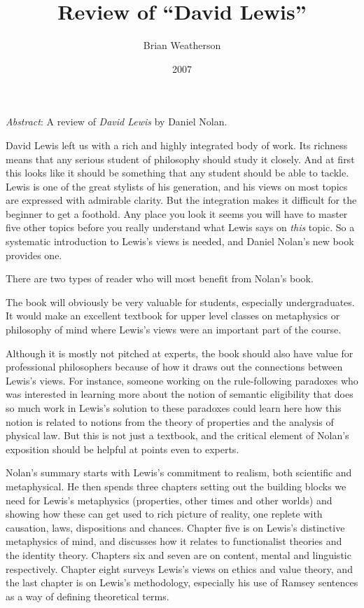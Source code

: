 \documentclass[
  11pt,
  letterpaper,
  DIV=11,
  numbers=noendperiod,
  twoside]{scrartcl}
\title{Review of ``David Lewis''}
\author{Brian Weatherson}
\date{2007}
\renewenvironment{abstract}
 {\vspace{-1.25cm}
 \quotation\small\noindent\emph{Abstract}:}
 {\endquotation}
\begin{document}
\maketitle
\begin{abstract}
A review of \emph{David Lewis} by Daniel Nolan.
\end{abstract}


David Lewis left us with a rich and highly integrated body of work. Its
richness means that any serious student of philosophy should study it
closely. And at first this looks like it should be something that any
student should be able to tackle. Lewis is one of the great stylists of
his generation, and his views on most topics are expressed with
admirable clarity. But the integration makes it difficult for the
beginner to get a foothold. Any place you look it seems you will have to
master five other topics before you really understand what Lewis says on
\emph{this} topic. So a systematic introduction to Lewis's views is
needed, and Daniel Nolan's new book provides one.

There are two types of reader who will most benefit from Nolan's book.

The book will obviously be very valuable for students, especially
undergraduates. It would make an excellent textbook for upper level
classes on metaphysics or philosophy of mind where Lewis's views were an
important part of the course.

Although it is mostly not pitched at experts, the book should also have
value for professional philosophers because of how it draws out the
connections between Lewis's views. For instance, someone working on the
rule-following paradoxes who was interested in learning more about the
notion of semantic eligibility that does so much work in Lewis's
solution to these paradoxes could learn here how this notion is related
to notions from the theory of properties and the analysis of physical
law. But this is not just a textbook, and the critical element of
Nolan's exposition should be helpful at points even to experts.

Nolan's summary starts with Lewis's commitment to realism, both
scientific and metaphysical. He then spends three chapters setting out
the building blocks we need for Lewis's metaphysics (properties, other
times and other worlds) and showing how these can get used to rich
picture of reality, one replete with causation, laws, dispositions and
chances. Chapter five is on Lewis's distinctive metaphysics of mind, and
discusses how it relates to functionalist theories and the identity
theory. Chapters six and seven are on content, mental and linguistic
respectively. Chapter eight surveys Lewis's views on ethics and value
theory, and the last chapter is on Lewis's methodology, especially his
use of Ramsey sentences as a way of defining theoretical terms.
\end{document}

